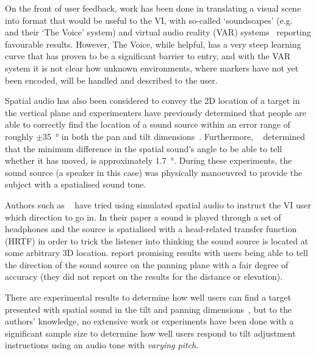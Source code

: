 \documentclass[format=sigconf, review=true, screen=true, anonymous=true]{acmart}
\begin{document}
On the front of user feedback, work has been done in translating a visual scene into format that would be useful to the VI, with so-called `soundscapes' (e.g. \citeauthor{meijer2010}~\cite{meijer2010} and their `The Voice' system) and virtual audio reality (VAR) systems~\cite{frauenberger2003} reporting favourable results. However, The Voice, while helpful, has a very steep learning curve that has proven to be a significant barrier to entry, and with the VAR system it is not clear how unknown environments, where markers have not yet been encoded, will be handled and described to the user. 

Spatial audio has also been considered to convey the 2D location of a target in the vertical plane and experimenters have previously determined that people are able to correctly find the location of a sound source within an error range of roughly $\pm$\SI{35}{\degree} in both the pan and tilt dimensions~\cite{zwiers2001spatial}. Furthermore, \citeauthor{ashmead1998spatial}~\cite{ashmead1998spatial} determined that the minimum difference in the spatial sound's angle to be able to tell whether it has moved, is approximately \SI{1.7}{\degree}. During these experiments, the sound source (a speaker in this case) was physically manoeuvred to provide the subject with a spatialised sound tone. 

Authors such as \citeauthor{holland2002audiogps}~\cite{holland2002audiogps} have tried using simulated spatial audio to instruct the VI user which direction to go in. In their paper a sound is played through a set of headphones and the source is spatialised with a head-related transfer function (HRTF) in order to trick the listener into thinking the sound source is located at some arbitrary 3D location. \citeauthor{holland2002audiogps} report promising results with users being able to tell the direction of the sound source on the panning plane with a fair degree of accuracy (they did not report on the results for the distance or elevation). %

There are experimental results to determine how well users can find a target presented with spatial sound in the tilt and panning dimensions~\cite{katz2011spatial, zwiers2001spatial}, but to the authors' knowledge, no extensive work or experiments have been done with a significant sample size to determine how well users respond to tilt adjustment instructions using an audio tone with \emph{varying pitch}. %
\end{document}
